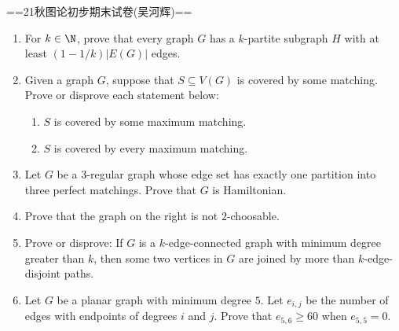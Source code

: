 ==21秋图论初步期末试卷(吴河辉)==
\begin{enumerate}
    \item For $k\in\N$, prove that every graph $G$ has a $k$-partite subgraph $H$ with at least $(1-1/k)|E(G)|$ edges.
    \item Given a graph $G$, suppose that $S \subseteq V(G)$ is covered by some matching. Prove or disprove each statement below:
    \begin{enumerate}[label=(\alph*)]
        \item $S$ is covered by some maximum matching.
        \item $S$ is covered by every maximum matching.
    \end{enumerate}
    \item Let $G$ be a $3$-regular graph whose edge set has exactly one partition into three perfect matchings. Prove that $G$ is Hamiltonian.
    \item Prove that the graph on the right is not $2$-choosable.
    \item Prove or disprove: If $G$ is a $k$-edge-connected graph with minimum degree greater than $k$, then some two vertices in $G$ are joined by more than $k$-edge-disjoint paths.
    \item Let $G$ be a planar graph with minimum degree $5$. Let $e_{i,j}$ be the number of edges with endpoints of degrees $i$ and $j$. Prove that $e_{5,6}\ge60$ when $e_{5,5}=0$.
\end{enumerate}